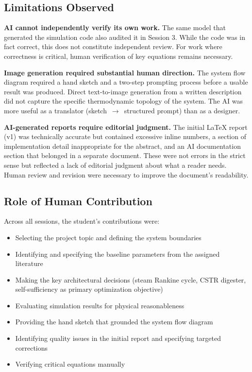 \documentclass[12pt, letterpaper]{article}
\begin{document}
\subsection{Limitations Observed}

\textbf{AI cannot independently verify its own work.} The same model that generated the simulation code also audited it in Session 3. While the code was in fact correct, this does not constitute independent review. For work where correctness is critical, human verification of key equations remains necessary.

\textbf{Image generation required substantial human direction.} The system flow diagram required a hand sketch and a two-step prompting process before a usable result was produced. Direct text-to-image generation from a written description did not capture the specific thermodynamic topology of the system. The AI was more useful as a translator (sketch~$\rightarrow$~structured prompt) than as a designer.

\textbf{AI-generated reports require editorial judgment.} The initial LaTeX report (v1) was technically accurate but contained excessive inline numbers, a section of implementation detail inappropriate for the abstract, and an AI documentation section that belonged in a separate document. These were not errors in the strict sense but reflected a lack of editorial judgment about what a reader needs. Human review and revision were necessary to improve the document's readability.

\subsection{Role of Human Contribution}

Across all sessions, the student's contributions were:

\begin{itemize}[noitemsep]
    \item Selecting the project topic and defining the system boundaries
    \item Identifying and specifying the baseline parameters from the assigned literature
    \item Making the key architectural decisions (steam Rankine cycle, CSTR digester, self-sufficiency as primary optimization objective)
    \item Evaluating simulation results for physical reasonableness
    \item Providing the hand sketch that grounded the system flow diagram
    \item Identifying quality issues in the initial report and specifying targeted corrections
    \item Verifying critical equations manually
\end{itemize}
\end{document}
